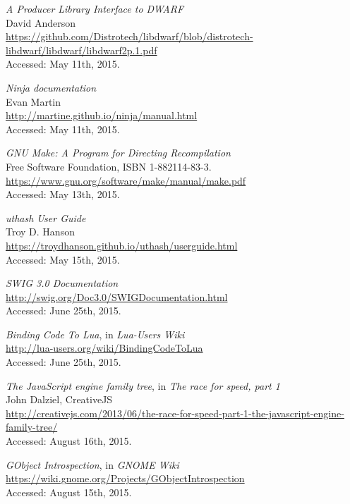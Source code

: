 \begin{thebibliography}{99}
		\emph{A Producer Library Interface to DWARF} \\
		David Anderson \\
		\url{https://github.com/Distrotech/libdwarf/blob/distrotech-libdwarf/libdwarf/libdwarf2p.1.pdf} \\
		Accessed: May 11th, 2015.

		\emph{Ninja documentation} \\
		Evan Martin \\
		\url{http://martine.github.io/ninja/manual.html} \\
		Accessed: May 11th, 2015.

		\emph{GNU Make: A Program for Directing Recompilation} \\
		Free Software Foundation, ISBN 1-882114-83-3. \\
		\url{https://www.gnu.org/software/make/manual/make.pdf} \\
		Accessed: May 13th, 2015.

		\emph{uthash User Guide} \\
		Troy D. Hanson \\
		\url{https://troydhanson.github.io/uthash/userguide.html} \\
		Accessed: May 15th, 2015.

		\emph{SWIG 3.0 Documentation} \\
		\url{http://swig.org/Doc3.0/SWIGDocumentation.html} \\
		Accessed: June 25th, 2015.

		\emph{Binding Code To Lua}, in \emph{Lua-Users Wiki} \\
		\url{http://lua-users.org/wiki/BindingCodeToLua} \\
		Accessed: June 25th, 2015.

		\emph{The JavaScript engine family tree},
		in \emph{The race for speed, part 1}  \\
		John Dalziel, CreativeJS \\
		\url{http://creativejs.com/2013/06/the-race-for-speed-part-1-the-javascript-engine-family-tree/} \\
		Accessed: August 16th, 2015.

		\emph{GObject Introspection}, in \emph{GNOME Wiki} \\
		\url{https://wiki.gnome.org/Projects/GObjectIntrospection} \\
		Accessed: August 15th, 2015.


\end{thebibliography}

